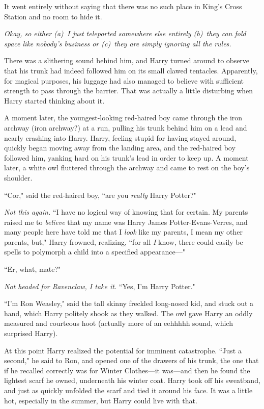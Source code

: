 It went entirely without saying that there was no such place in King's Cross Station and no room to hide it.

\emph{Okay, so either (a)~I just teleported somewhere else entirely (b)~they can fold space like nobody's business or (c)~they are simply ignoring all the rules.}

There was a slithering sound behind him, and Harry turned around to observe that his trunk had indeed followed him on its small clawed tentacles. Apparently, for magical purposes, his luggage had also managed to believe with sufficient strength to pass through the barrier. That was actually a little disturbing when Harry started thinking about it.

A moment later, the youngest-looking red-haired boy came through the iron archway (iron archway?) at a run, pulling his trunk behind him on a lead and nearly crashing into Harry. Harry, feeling stupid for having stayed around, quickly began moving away from the landing area, and the red-haired boy followed him, yanking hard on his trunk's lead in order to keep up. A moment later, a white owl fluttered through the archway and came to rest on the boy's shoulder.

``Cor," said the red-haired boy, ``are you \emph{really} Harry Potter?"

\emph{Not this again.} ``I have no logical way of knowing that for certain. My parents raised me to \emph{believe} that my name was Harry James Potter-Evans-Verres, and many people here have told me that I \emph{look} like my parents, I mean my other parents, but," Harry frowned, realizing, ``for all \emph{I} know, there could easily be spells to polymorph a child into a specified appearance—"

``Er, what, mate?"

\emph{Not headed for Ravenclaw, I take it.} ``Yes, I'm Harry Potter."

``I'm Ron Weasley," said the tall skinny freckled long-nosed kid, and stuck out a hand, which Harry politely shook as they walked. The owl gave Harry an oddly measured and courteous hoot (actually more of an eehhhhh sound, which surprised Harry).

At this point Harry realized the potential for imminent catastrophe. ``Just a second," he said to Ron, and opened one of the drawers of his trunk, the one that if he recalled correctly was for Winter Clothes—it was—and then he found the lightest scarf he owned, underneath his winter coat. Harry took off his sweatband, and just as quickly unfolded the scarf and tied it around his face. It was a little hot, especially in the summer, but Harry could live with that.

